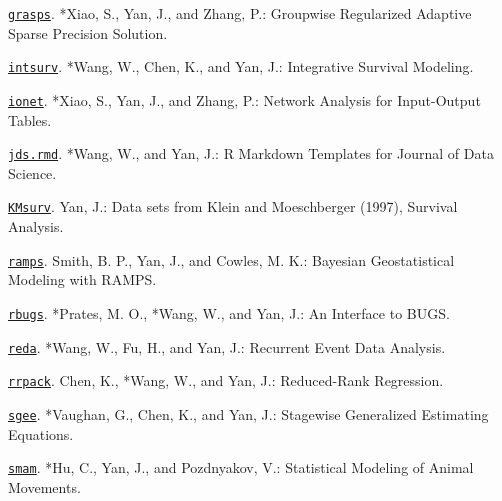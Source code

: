 \begin{Software}
\item \href{https://CRAN.R-project.org/package=grasps}{\texttt{grasps}}.
*Xiao, S., Yan, J., and Zhang, P.: Groupwise Regularized
Adaptive Sparse Precision Solution.

\item \href{https://CRAN.R-project.org/package=intsurv}{\texttt{intsurv}}.
*Wang, W., Chen, K., and Yan, J.: Integrative Survival
Modeling.

\item \href{https://CRAN.R-project.org/package=ionet}{\texttt{ionet}}.
*Xiao, S., Yan, J., and Zhang, P.: Network Analysis for
Input-Output Tables.

\item \href{https://CRAN.R-project.org/package=jds.rmd}{\texttt{jds.rmd}}.
*Wang, W., and Yan, J.: R Markdown Templates for Journal of
Data Science.

\item \href{https://CRAN.R-project.org/package=KMsurv}{\texttt{KMsurv}}. Yan,
J.: Data sets from Klein and Moeschberger (1997), Survival Analysis.

\item \href{https://CRAN.R-project.org/package=ramps}{\texttt{ramps}}. Smith,
B. P., Yan, J., and Cowles, M. K.: Bayesian Geostatistical Modeling with
RAMPS.

\item \href{https://cran.r-project.org/src/contrib/Archive/rbugs/}{\texttt{rbugs}}.
*Prates, M. O., *Wang, W., and Yan, J.: An
Interface to BUGS.

\item \href{https://CRAN.R-project.org/package=reda}{\texttt{reda}}.
*Wang, W., Fu, H., and Yan, J.: Recurrent Event Data
Analysis.

\item \href{https://CRAN.R-project.org/package=rrpack}{\texttt{rrpack}}. Chen,
K., *Wang, W., and Yan, J.: Reduced-Rank Regression.

\item \href{https://CRAN.R-project.org/package=sgee}{\texttt{sgee}}.
*Vaughan, G., Chen, K., and Yan, J.: Stagewise Generalized
Estimating Equations.

\item \href{https://CRAN.R-project.org/package=smam}{\texttt{smam}}.
*Hu, C., Yan, J., and Pozdnyakov, V.: Statistical Modeling
of Animal Movements.


\end{Software}

